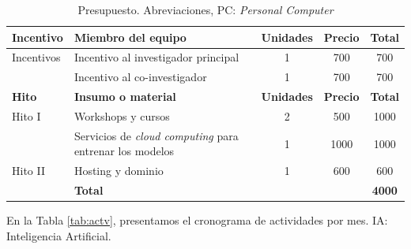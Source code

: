 \documentclass[a4paper]{article}
\begin{document}
\begin{table}[H]
	\centering
	\setlength{\tabcolsep}{0.5em} %
	{\renewcommand{\arraystretch}{1.2}%
		\caption{Presupuesto. Abreviaciones, PC: \textit{Personal Computer}}
		\label{tab:presupuesto}
		\begin{tabular}{|p{1.5cm}|p{8.2cm}|c|c|c|} \hline
			\textbf{Incentivo}    & \textbf{Miembro del equipo}    & \textbf{Unidades} & \textbf{Precio} & \textbf{Total} \\ \hline
			Incentivos & Incentivo al investigador principal          & 1                 & 700            & 700           \\
			& Incentivo al co-investigador & 1                 & 700            & 700           \\ \hline \hline
			
			\textbf{Hito}    & \textbf{Insumo o material}    & \textbf{Unidades} & \textbf{Precio} & \textbf{Total} \\ \hline
			Hito I & Workshops y cursos       & 2                 & 500            & 1000           \\
			& Servicios de \textit{cloud computing} para entrenar los modelos       & 1                 & 1000            & 1000           \\ \hline
			Hito II &  Hosting y dominio                      & 1                 & 600            & 600           \\
			 \hline
			& \textbf{Total}                         &                   &                 & \textbf{4000}         \\ \hline
		\end{tabular}
	}
\end{table}


En la Tabla \ref{tab:actv}, presentamos el cronograma de actividades por mes. IA: Inteligencia Artificial.
\end{document}
